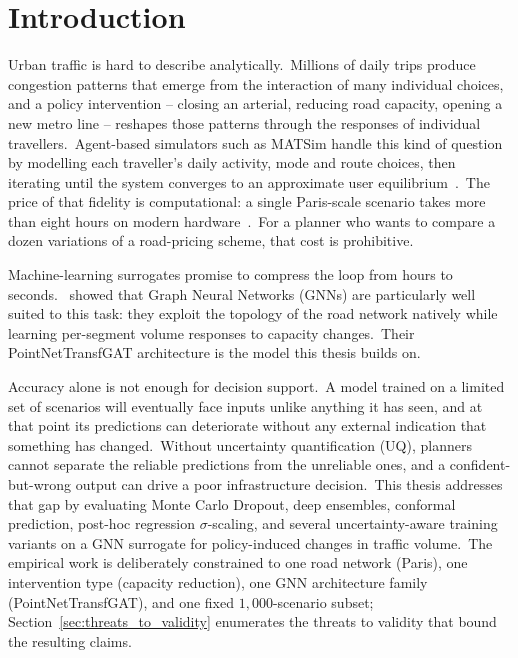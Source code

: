 
\chapter{Introduction}\label{chapter:introduction}

Urban traffic is hard to describe analytically.\ Millions of daily trips produce congestion patterns that emerge from the interaction of many individual choices, and a policy intervention -- closing an arterial, reducing road capacity, opening a new metro line -- reshapes those patterns through the responses of individual travellers.\ Agent-based simulators such as MATSim handle this kind of question by modelling each traveller's daily activity, mode and route choices, then iterating until the system converges to an approximate user equilibrium~\autocite{horni2016matsim,bonabeau2002agent,railsback2019agent}.\ The price of that fidelity is computational: a single Paris-scale scenario takes more than eight hours on modern hardware~\autocite{natterer2025ml}.\ For a planner who wants to compare a dozen variations of a road-pricing scheme, that cost is prohibitive.

Machine-learning surrogates promise to compress the loop from hours to seconds.\ \textcite{natterer2025ml} showed that Graph Neural Networks (GNNs) are particularly well suited to this task: they exploit the topology of the road network natively while learning per-segment volume responses to capacity changes.\ Their PointNetTransfGAT architecture is the model this thesis builds on.

Accuracy alone is not enough for decision support.\ A model trained on a limited set of scenarios will eventually face inputs unlike anything it has seen, and at that point its predictions can deteriorate without any external indication that something has changed.\ Without uncertainty quantification (UQ), planners cannot separate the reliable predictions from the unreliable ones, and a confident-but-wrong output can drive a poor infrastructure decision.\ This thesis addresses that gap by evaluating Monte Carlo Dropout, deep ensembles, conformal prediction, post-hoc regression $\sigma$-scaling, and several uncertainty-aware training variants on a GNN surrogate for policy-induced changes in traffic volume.\ The empirical work is deliberately constrained to one road network (Paris), one intervention type (capacity reduction), one GNN architecture family (PointNetTransfGAT), and one fixed $1{,}000$-scenario subset; Section~\ref{sec:threats_to_validity} enumerates the threats to validity that bound the resulting claims.


